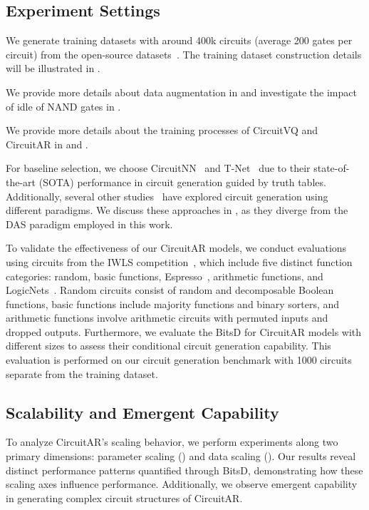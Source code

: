\subsection{Experiment Settings}

We generate training datasets with around 400k circuits (average 200 gates per circuit) from the open-source datasets~\cite{bryan1985iscas, albrecht2005iwls, amaru2015epfl}.
The training dataset construction details will be illustrated in .

We provide more details about data augmentation in  and investigate the impact of idle of NAND gates in .

We provide more details about the training processes of CircuitVQ and CircuitAR in  and . 

For baseline selection, we choose CircuitNN~\cite{deepmind2024ai4sys} and T-Net~\cite{wang2024tnet} due to their state-of-the-art (SOTA) performance in circuit generation guided by truth tables. 
Additionally, several other studies~\cite{tsaras2024shortcircuit, li2024circuittrans, zhou2024seadag} have explored circuit generation using different paradigms. 
We discuss these approaches in , as they diverge from the DAS paradigm employed in this work.

To validate the effectiveness of our CircuitAR models, we conduct evaluations using circuits from the IWLS competition~\cite{2022iwls}, which include five distinct function categories: random, basic functions, Espresso~\cite{rudell1985espresso}, arithmetic functions, and LogicNets~\cite{umuroglu2020logicnets}. 
Random circuits consist of random and decomposable Boolean functions, basic functions include majority functions and binary sorters, and arithmetic functions involve arithmetic circuits with permuted inputs and dropped outputs. 
Furthermore, we evaluate the BitsD for CircuitAR models with different sizes to assess their conditional circuit generation capability. 
This evaluation is performed on our circuit generation benchmark with 1000 circuits separate from the training dataset.

\subsection{Scalability and Emergent Capability}
\label{sec:scale}
To analyze CircuitAR's scaling behavior, we perform experiments along two primary dimensions: parameter scaling () and data scaling (). 
Our results reveal distinct performance patterns quantified through BitsD, demonstrating how these scaling axes influence performance.
Additionally, we observe emergent capability in generating complex circuit structures of CircuitAR.


